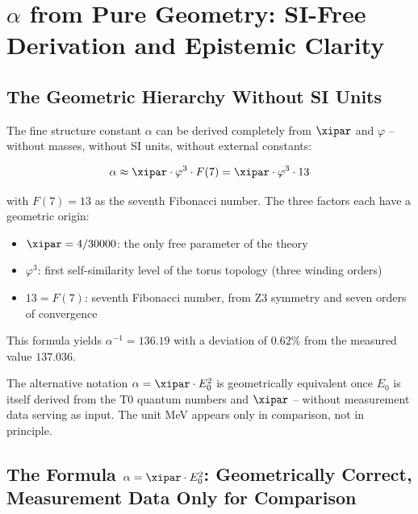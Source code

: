 \section{\texorpdfstring{$\alpha$ from Pure Geometry: SI-Free Derivation and Epistemic Clarity}{from Pure Geometry: SI-Free Derivation and Epistemic Clarity}}

\subsection{The Geometric Hierarchy Without SI Units}

The fine structure constant $\alpha$ can be derived completely from $\xipar$ and $\varphi$ -- without masses, without SI units, without external constants:

\begin{equation}
  \alpha \approx \xipar \cdot \varphi^3 \cdot F(7) = \xipar \cdot \varphi^3 \cdot 13
\end{equation}

with $F(7) = 13$ as the seventh Fibonacci number. The three factors each have a geometric origin:
\begin{itemize}[noitemsep]
  \item $\xipar = 4/30000$: the only free parameter of the theory
  \item $\varphi^3$: first self-similarity level of the torus topology (three winding orders)
  \item $13 = F(7)$: seventh Fibonacci number, from Z3 symmetry and seven orders of convergence
\end{itemize}

This formula yields $\alpha^{-1} = 136.19$ with a deviation of $0.62\%$ from the measured value $137.036$.

\medskip
The alternative notation $\alpha = \xipar \cdot E_0^2$ is geometrically equivalent once $E_0$ is itself derived from the T0 quantum numbers and $\xipar$ -- without measurement data serving as input. The unit MeV appears only in comparison, not in principle.

\subsection{\texorpdfstring{The Formula $\alpha = \xipar \cdot E_0^2$: Geometrically Correct, Measurement Data Only for Comparison}{The Formula : Geometrically Correct, Measurement Data Only for Comparison}}

